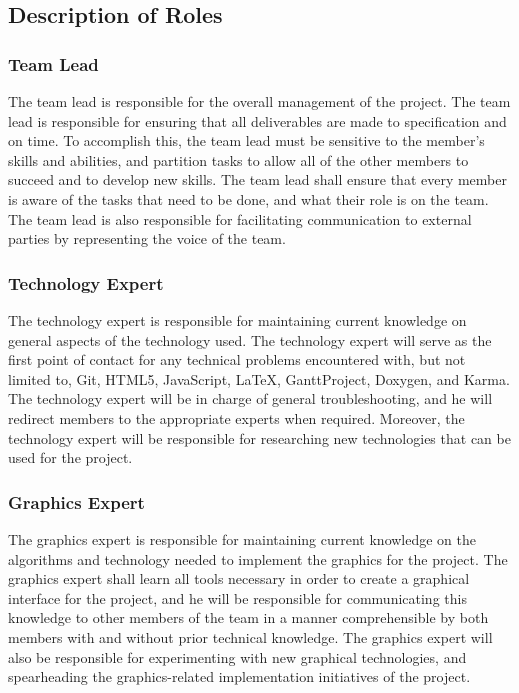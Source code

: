 \documentclass{article}
\begin{document}
\subsection{Description of Roles}

\subsubsection{Team Lead}
The team lead is responsible for the overall management of the project. The team 
lead is responsible for ensuring that all deliverables are made to 
specification and on time. To accomplish this, the team lead must be sensitive 
to the member's skills and abilities, and partition tasks to allow all of the 
other members to succeed and to develop new skills. The team lead shall ensure 
that every member is aware of the tasks that need to be done, and what their 
role is on the team. The team lead is also responsible for facilitating 
communication to external parties by representing the voice of the team.

\subsubsection{Technology Expert}
The technology expert is responsible for maintaining current knowledge on 
general aspects of the technology used. The technology expert will serve as the 
first point of contact for any technical problems encountered with, but not 
limited to, Git, HTML5, JavaScript, \LaTeX, GanttProject, Doxygen, and Karma. 
The technology expert will be in charge of general troubleshooting, and he will 
redirect members to the appropriate experts when required. Moreover, the 
technology expert will be responsible for researching new technologies that can 
be used for the project.

\subsubsection{Graphics Expert}
The graphics expert is responsible for maintaining current knowledge on the 
algorithms and technology needed to implement the graphics for the project. The 
graphics expert shall learn all tools necessary in order to create a graphical 
interface for the project, and he will be responsible for communicating this 
knowledge to other members of the team in a manner comprehensible by both 
members with and without prior technical knowledge. The graphics expert will 
also be responsible for experimenting with new graphical technologies, and 
spearheading the graphics-related implementation initiatives of the project. 
\end{document}
